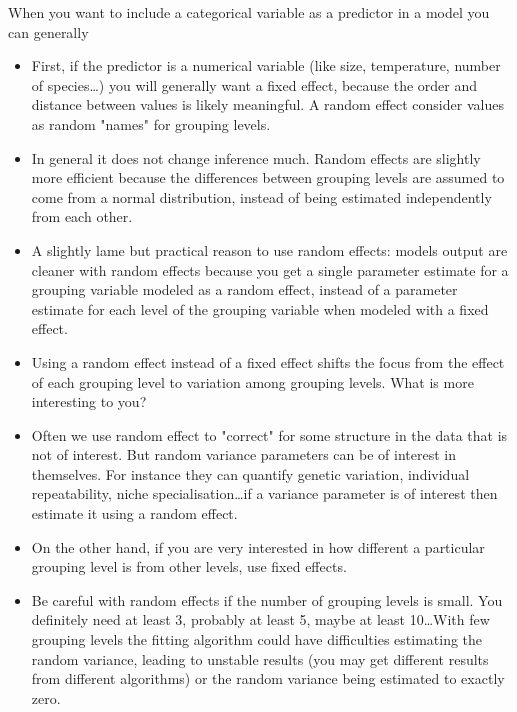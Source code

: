 \documentclass[12pt,a4paper]{scrartcl}\usepackage[]{graphicx}\usepackage[]{color}
\begin{document}
\begin{tcolorbox}[colback=green!5,colframe=green!40!black,title=Fixed or random effect?]
When you want to include a categorical variable as a predictor in a model you can generally 
\begin{itemize}
\item First, if the predictor is a numerical variable (like size, temperature, number of species\dots) you will generally want a fixed effect, because the order and distance between values is likely meaningful. A random effect consider values as random "names" for grouping levels.
\item In general it does not change inference much. Random effects are slightly more efficient because the differences between grouping levels are assumed to come from a normal distribution, instead of being estimated independently from each other. 
\item A slightly lame but practical reason to use random effects: models output are cleaner with random effects because you get a single parameter estimate for a grouping variable modeled as a random effect, instead of a parameter estimate for each level of the grouping variable when modeled with a fixed effect.
\item Using a random effect instead of a fixed effect shifts the focus from the effect of each grouping level to variation among grouping levels. What is more interesting to you?
\item Often we use random effect to "correct" for some structure in the data that is not of interest. But random variance parameters can be of interest in themselves. For instance they can quantify genetic variation, individual repeatability, niche specialisation\dots if a variance parameter is of interest then estimate it using a random effect.
\item On the other hand, if you are very interested in how different a particular grouping level is from other levels, use fixed effects.
\item Be careful with random effects if the number of grouping levels is small. You definitely need at least 3, probably at least 5, maybe at least 10\dots With few grouping levels the fitting algorithm could have difficulties estimating the random variance, leading to unstable results (you may get different results from different algorithms) or the random variance being estimated to exactly zero.
\end{itemize}
\end{tcolorbox}
\end{document}
